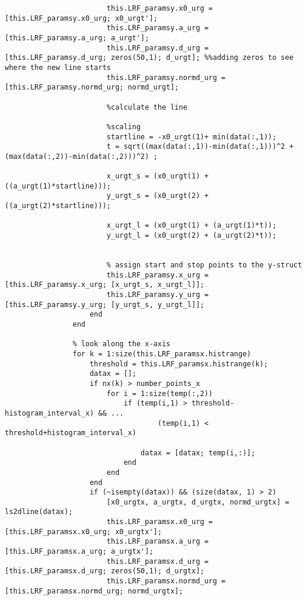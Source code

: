 \begin{lstlisting}
                        this.LRF_paramsy.x0_urg = [this.LRF_paramsy.x0_urg; x0_urgt'];
                        this.LRF_paramsy.a_urg = [this.LRF_paramsy.a_urg; a_urgt'];
                        this.LRF_paramsy.d_urg = [this.LRF_paramsy.d_urg; zeros(50,1); d_urgt]; %%adding zeros to see where the new line starts
                        this.LRF_paramsy.normd_urg =[this.LRF_paramsy.normd_urg; normd_urgt];
                        
                        %calculate the line
                        
                        %scaling
                        startline = -x0_urgt(1)+ min(data(:,1));
                        t = sqrt((max(data(:,1))-min(data(:,1)))^2 + (max(data(:,2))-min(data(:,2)))^2) ;
                        
                        x_urgt_s = (x0_urgt(1) + ((a_urgt(1)*startline)));
                        y_urgt_s = (x0_urgt(2) + ((a_urgt(2)*startline)));
                        
                        x_urgt_l = (x0_urgt(1) + (a_urgt(1)*t));
                        y_urgt_l = (x0_urgt(2) + (a_urgt(2)*t));
                        
                        
                        % assign start and stop points to the y-struct
                        this.LRF_paramsy.x_urg = [this.LRF_paramsy.x_urg; [x_urgt_s, x_urgt_l]];
                        this.LRF_paramsy.y_urg = [this.LRF_paramsy.y_urg; [y_urgt_s, y_urgt_l]];
                    end
                end
                
                % look along the x-axis
                for k = 1:size(this.LRF_paramsx.histrange)
                    threshold = this.LRF_paramsx.histrange(k);
                    datax = [];
                    if nx(k) > number_points_x
                        for i = 1:size(temp(:,2))
                            if (temp(i,1) > threshold-histogram_interval_x) && ...
                                    (temp(i,1) < threshold+histogram_interval_x)
                                
                                datax = [datax; temp(i,:)];
                            end
                        end
                    end
                    if (~isempty(datax)) && (size(datax, 1) > 2)
                        [x0_urgtx, a_urgtx, d_urgtx, normd_urgtx] = ls2dline(datax);
                        this.LRF_paramsx.x0_urg = [this.LRF_paramsx.x0_urg; x0_urgtx'];
                        this.LRF_paramsx.a_urg = [this.LRF_paramsx.a_urg; a_urgtx'];
                        this.LRF_paramsx.d_urg = [this.LRF_paramsx.d_urg; zeros(50,1); d_urgtx];
                        this.LRF_paramsx.normd_urg =[this.LRF_paramsx.normd_urg; normd_urgtx];
                        

\end{lstlisting}
